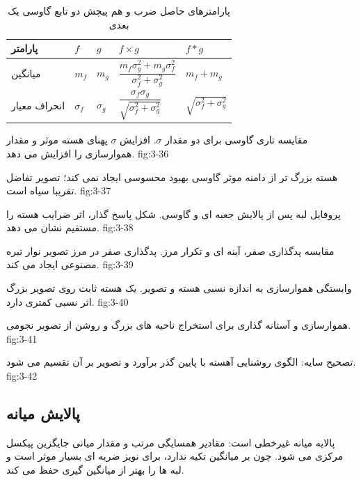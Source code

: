 \begin{table}[H]
\centering
\caption{پارامترهای حاصل ضرب و هم پیچش دو تابع گاوسی یک بعدی}
\label{tab:3-6}
\small
\setlength{\tabcolsep}{3pt}
\begin{tabular}{p{}p{}p{}p{}p{}}
\toprule
پارامتر & \(f\) & \(g\) & \(f\times g\) & \(f*g\)\\
\midrule
میانگین & \(m_f\) & \(m_g\) &
\(\dfrac{m_f\sigma_g^2+m_g\sigma_f^2}{\sigma_f^2+\sigma_g^2}\) &
\(m_f+m_g\)\\[2mm]
انحراف معیار & \(\sigma_f\) & \(\sigma_g\) &
\(\dfrac{\sigma_f\sigma_g}{\sqrt{\sigma_f^2+\sigma_g^2}}\) &
\(\sqrt{\sigma_f^2+\sigma_g^2}\)\\
\bottomrule
\end{tabular}
\end{table}

{مقایسه تاری گاوسی برای دو مقدار \(\sigma\). افزایش \(\sigma\) پهنای هسته موثر
و مقدار هموارسازی را افزایش می دهد.}
{fig:3-36}

{هسته بزرگ تر از دامنه موثر گاوسی بهبود محسوسی ایجاد نمی کند؛ تصویر تفاضل
تقریبا سیاه است.}
{fig:3-37}

{پروفایل لبه پس از پالایش جعبه ای و گاوسی. شکل پاسخ گذار، اثر ضرایب هسته را
مستقیم نشان می دهد.}
{fig:3-38}

{مقایسه پدگذاری صفر، آینه ای و تکرار مرز. پدگذاری صفر در مرز تصویر نوار تیره
مصنوعی ایجاد می کند.}
{fig:3-39}

{وابستگی هموارسازی به اندازه نسبی هسته و تصویر. یک هسته ثابت روی تصویر بزرگ
اثر نسبی کمتری دارد.}
{fig:3-40}

{هموارسازی و آستانه گذاری برای استخراج ناحیه های بزرگ و روشن از تصویر
نجومی.}
{fig:3-41}

{تصحیح سایه: الگوی روشنایی آهسته با پایین گذر برآورد و تصویر بر آن تقسیم
می شود.}
{fig:3-42}

\subsection{پالایش میانه}

پالایه میانه غیرخطی است: مقادیر همسایگی مرتب و مقدار میانی جایگزین پیکسل
مرکزی می شود. چون بر میانگین تکیه ندارد، برای نویز ضربه ای بسیار موثر است و
لبه ها را بهتر از میانگین گیری حفظ می کند.

